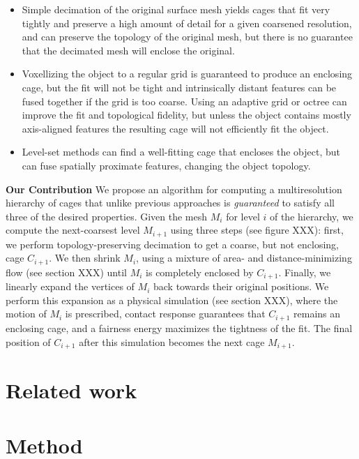 \documentclass{acmtog}
\begin{document}
\begin{itemize}
\item Simple decimation of the original surface mesh yields cages that fit very tightly and preserve a high amount of detail for a given coarsened resolution, and can preserve the topology of the original mesh, but there is no guarantee that the decimated mesh will enclose the original.
\item Voxellizing the object to a regular grid is guaranteed to produce an enclosing cage, but the fit will not be tight and intrinsically distant features can be fused together if the grid is too coarse. Using an adaptive grid or octree can improve the fit and topological fidelity, but unless the object contains mostly axis-aligned features the resulting cage will not efficiently fit the object.
\item Level-set methods can find a well-fitting cage that encloses the object, but can fuse spatially proximate features, changing the object topology.
\end{itemize}

\noindent\textbf{Our Contribution} We propose an algorithm for computing a multiresolution hierarchy of cages that unlike previous approaches is \emph{guaranteed} to satisfy all three of the desired properties. Given the mesh $M_i$ for level $i$ of the hierarchy, we compute the next-coarsest level $M_{i+1}$ using three steps (see figure XXX): first, we perform topology-preserving decimation to get a coarse, but not enclosing, cage $C_{i+1}$. We then shrink $M_i$, using a mixture of area- and distance-minimizing flow (see section XXX) until $M_i$ is completely enclosed by $C_{i+1}$. Finally, we linearly expand the vertices of $M_i$ back towards their original positions. We perform this expansion as a physical simulation (see section XXX), where the motion of $M_i$ is prescribed, contact response guarantees that $C_{i+1}$ remains an enclosing cage, and a fairness energy maximizes the tightness of the fit. The final position of $C_{i+1}$ after this simulation becomes the next cage $M_{i+1}$.

\section{Related work}
\label{sec:related}

\section{Method}
\label{sec:method}
\end{document}
